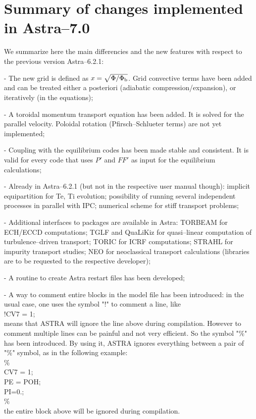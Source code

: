 \section{Summary of changes implemented in Astra--7.0}
We summarize here the main differencies and the new features with respect to the
previous version Astra--6.2.1:

- The new grid is defined as $x=\sqrt{\Phi/\Phi_{\rm b}}$. Grid convective terms
have been added and can be treated either a posteriori (adiabatic 
compression/expansion), or iteratively (in the equations);

- A toroidal momentum transport equation has been added. It is solved for the parallel velocity. Poloidal rotation (Pfirsch--Schlueter terms) are not yet implemented;

- Coupling with the equilibrium codes has been made stable and consistent. It is
valid for every code that uses $P'$ and $FF'$ as input for the equilibrium
calculations;

- Already in Astra--6.2.1 (but not in the respective user manual though): implicit equipartition for Te, Ti evolution; possibility of running several independent processes in parallel with IPC; numerical scheme for stiff transport problems;

- Additional interfaces to packages are available in Astra: TORBEAM for ECH/ECCD computations; TGLF and QuaLiKiz for quasi--linear computation of turbulence--driven transport; TORIC for ICRF computations; STRAHL for impurity transport studies; NEO for neoclassical transport calculations (libraries are to be requested to the respective developer);

- A routine to create Astra restart files has been developed; 

- A way to comment entire blocks in the model file has been introduced:
in the usual case, one uses the symbol "!" to comment a line, like \\
!CV7 = 1;\\
means that ASTRA will ignore the line above during compilation.
However to comment multiple lines can be painful and not very efficient.
So the symbol "\%" has been introduced. By using it, ASTRA ignores everything between a pair of "\%" symbol, as in the following example:\\
\% \\
CV7 = 1;\\
PE = POH;\\
PI=0.;\\
\% \\
the entire block above will be ignored during compilation.

